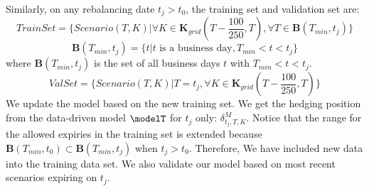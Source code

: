 \begin{steps}
  
	
	\item Similarly, on any rebalancing date $t_j>t_0$,  the training set  and validation set are: 
		\[TrainSet=\{Scenario(T,K)|\forall K \in \mathbf{K}_{grid}(T-\frac{100}{250},T),\forall T \in \mathbf{B}(T_{min},t_j)\}\]
		\[
		\mathbf{B}(T_{min},t_j)=\{ t|t \text{ is a business day},  T_{min}< t <t_j\} 
		\]
	where $\mathbf{B}(T_{min},t_j)$ is the set of all business days $t$ with  $T_{min}< t <t_j$.
	\[ValSet=\{Scenario(T,K)|T=t_j, \forall K  \in \mathbf{K}_{grid}(T-\frac{100}{250},T)\}\]
	We update the model based on the new training set. We get the hedging position from the data-driven model $\modelT$ for $t_j$ only: $\delta^{M}_{t_j,T,K}$. Notice that  the range for the allowed expiries in the training set is extended because $\mathbf{B}(T_{min},t_0) \subset \mathbf{B}(T_{min},t_j)$ when  $t_j>t_0$. Therefore, We have included new data into the training data set. We also validate our model based on most recent scenarios expiring on $t_j$.
\end{steps}


